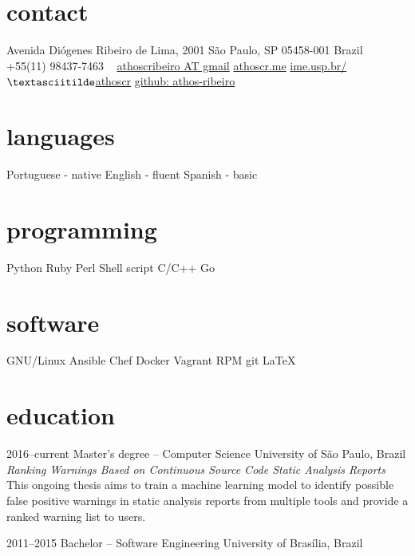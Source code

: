 \documentclass[]{friggeri-cv} %
\begin{document}


\begin{aside} %
\section{contact}
Avenida Diógenes Ribeiro de Lima, 2001
São Paulo, SP 05458-001
Brazil
~
+55(11) 98437-7463
~
\href{mailto:athoscribeiro@gmail.com}{athoscribeiro AT gmail}
\href{http://athoscr.me}{athoscr.me}
\href{https://www.ime.usp.br/~athoscr}{ime.usp.br/$\textasciitilde$athoscr}
\href{https://github.com/athos-ribeiro}{github: athos-ribeiro}
\section{languages}
Portuguese - native
English - fluent
Spanish - basic
\section{programming}
Python
Ruby
Perl
Shell script
C/C++
Go
\section{software}
GNU/Linux
Ansible
Chef
Docker
Vagrant
RPM
git
\LaTeX
\end{aside}


\section{education}

\begin{entrylist}


\entry
{2016--current}
{Master's degree -- {\normalfont Computer Science}}
{University of São Paulo, Brazil}
  {\emph{Ranking Warnings Based on Continuous Source Code Static Analysis Reports} \\ This ongoing thesis aims to train a machine learning model to identify possible false positive warnings in static analysis reports from multiple tools and provide a ranked warning list to users.}


\entry
{2011--2015}
{Bachelor -- {\normalfont Software Engineering}}
{University of Brasília, Brazil}


\end{entrylist}
\end{document}
